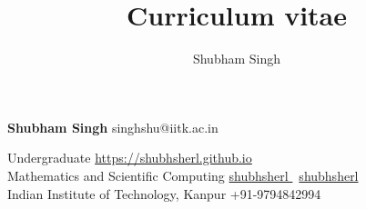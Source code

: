 \documentclass[9pt]{extarticle}
\title{Curriculum vitae}
\author{Shubham Singh}
\begin{document}

\begingroup
{}

{\Huge\textbf{\sc Shubham Singh}}
\hfill
singhshu@iitk.ac.in \faEnvelope


Undergraduate
\hfill
\href{https://shubhsherl.github.io}{https://shubhsherl.github.io \faHome}\\

Mathematics and Scientific Computing
\hfill
\href{https://github.com/shubhsherl}{shubhsherl \faGithub} \textbar \ 
\href{https://www.linkedin.com/in/shubhsherl/}{shubhsherl \faLinkedin} \\

Indian Institute of Technology, Kanpur
\hfill
+91-9794842994 \faMobile \\

\begin{minipage}[t]{0.49\textwidth}
  \vspace{7mm}
  
\end{minipage}
\begin{minipage}[t]{0.49\textwidth}
  \vspace{7mm}
  
  
  
  
%   
  
  \vspace{1mm}
  
\end{minipage}
\hfill



\endgroup
\end{document}
